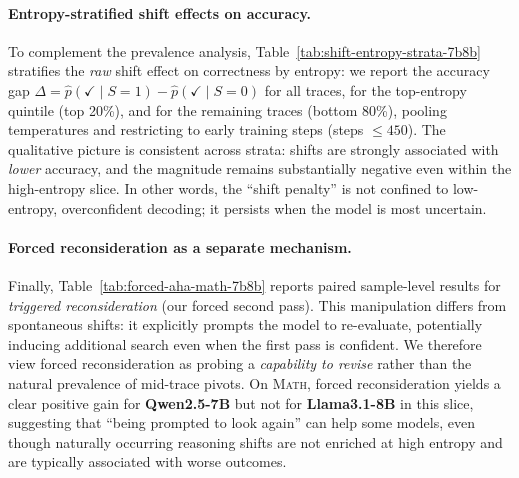 \paragraph{Entropy-stratified shift effects on accuracy.}
To complement the prevalence analysis, Table~\ref{tab:shift-entropy-strata-7b8b} stratifies the \emph{raw} shift effect on correctness by entropy: we report the accuracy gap
$\Delta = \hat p(\checkmark\mid S{=}1) - \hat p(\checkmark\mid S{=}0)$
for all traces, for the top-entropy quintile (top 20\%), and for the remaining traces (bottom 80\%), pooling temperatures and restricting to early training steps (steps $\le\!450$). The qualitative picture is consistent across strata: shifts are strongly associated with \emph{lower} accuracy, and the magnitude remains substantially negative even within the high-entropy slice. In other words, the ``shift penalty'' is not confined to low-entropy, overconfident decoding; it persists when the model is most uncertain.

\paragraph{Forced reconsideration as a separate mechanism.}
Finally, Table~\ref{tab:forced-aha-math-7b8b} reports paired sample-level results for \emph{triggered reconsideration} (our forced second pass). This manipulation differs from spontaneous shifts: it explicitly prompts the model to re-evaluate, potentially inducing additional search even when the first pass is confident. We therefore view forced reconsideration as probing a \emph{capability to revise} rather than the natural prevalence of mid-trace pivots. On \textsc{Math}, forced reconsideration yields a clear positive gain for \textbf{Qwen2.5-7B} but not for \textbf{Llama3.1-8B} in this slice, suggesting that ``being prompted to look again'' can help some models, even though naturally occurring reasoning shifts are not enriched at high entropy and are typically associated with worse outcomes.

